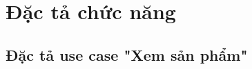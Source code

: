 \documentclass[../DoAn.tex]{subfiles}
\begin{document}


\section{Đặc tả chức năng}
\label{section:2.3}
\subsection{Đặc tả use case "Xem sản phẩm"}
\hfill
\end{document}
